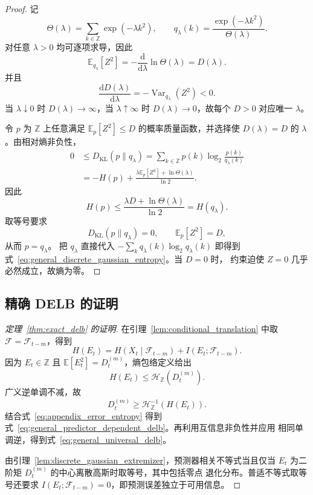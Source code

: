 \begin{proof}
记
\[
\Theta(\lambda)
=
\sum_{k\in\mathbb{Z}}\exp(-\lambda k^2),
\qquad
q_\lambda(k)
=
\frac{\exp(-\lambda k^2)}{\Theta(\lambda)}.
\]
对任意 \(\lambda>0\) 均可逐项求导，因此
\[
\mathbb{E}_{q_\lambda}[Z^2]
=
-\frac{\mathrm{d}}{\mathrm{d}\lambda}\ln\Theta(\lambda)
=D(\lambda).
\]
并且
\[
\frac{\mathrm{d}D(\lambda)}{\mathrm{d}\lambda}
=
-\operatorname{Var}_{q_\lambda}(Z^2)<0.
\]
当 \(\lambda\downarrow0\) 时 \(D(\lambda)\to\infty\)，当
\(\lambda\uparrow\infty\) 时 \(D(\lambda)\to0\)，故每个 \(D>0\)
对应唯一 \(\lambda\)。

令 \(p\) 为 \(\mathbb Z\) 上任意满足
\(\mathbb{E}_{p}[Z^2]\leq D\) 的概率质量函数，并选择使
\(D(\lambda)=D\) 的 \(\lambda\)。由相对熵非负性，
\begin{align}
0
&\leq
D_{\mathrm{KL}}(p\|q_\lambda)
=
\sum_{k\in\mathbb{Z}}p(k)
\log_2\frac{p(k)}{q_\lambda(k)}
\nonumber\\
&=
-H(p)
+
\frac{\lambda\mathbb{E}_{p}[Z^2]+\ln\Theta(\lambda)}{\ln2}.
\label{eq:kl_discrete_gaussian}
\end{align}
因此
\begin{equation}
H(p)
\leq
\frac{\lambda D+\ln\Theta(\lambda)}{\ln2}
=
H(q_\lambda).
\label{eq:integer_max_entropy}
\end{equation}
取等号要求
\[
D_{\mathrm{KL}}(p\|q_\lambda)=0,
\qquad
\mathbb{E}_{p}[Z^2]=D,
\]
从而 \(p=q_\lambda\)。
把 \(q_\lambda\) 直接代入
\(-\sum_kq_\lambda(k)\log_2q_\lambda(k)\) 即得到
式~\eqref{eq:general_discrete_gaussian_entropy}。当 \(D=0\) 时，
约束迫使 \(Z=0\) 几乎必然成立，故熵为零。
\end{proof}

\subsection{精确 DELB 的证明}

\begin{proof}[定理~\ref{thm:exact_delb} 的证明]
在引理~\ref{lem:conditional_translation} 中取
\(\mathcal F=\mathcal F_{t-m}\)，得到
\begin{equation}
H(E_t)
=
H(X_t\mid\mathcal{F}_{t-m})
+
I(E_t;\mathcal{F}_{t-m}).
\label{eq:appendix_error_entropy}
\end{equation}
因为 \(E_t\in\mathbb Z\) 且
\(\mathbb E[E_t^2]=D_t^{(m)}\)，熵包络定义给出
\[
H(E_t)\leq\mathcal{H}_{\mathbb{Z}}(D_t^{(m)}).
\]
广义逆单调不减，故
\[
D_t^{(m)}
\geq
\mathcal{H}_{\mathbb{Z}}^{-1}\!\left(H(E_t)\right).
\]
结合式~\eqref{eq:appendix_error_entropy} 得到
式~\eqref{eq:general_predictor_dependent_delb}。再利用互信息非负性并应用
相同单调逆，得到式~\eqref{eq:general_universal_delb}。

由引理~\ref{lem:discrete_gaussian_extremizer}，预测器相关不等式当且仅当
\(E_t\) 为二阶矩 \(D_t^{(m)}\) 的中心离散高斯时取等号，其中包括零点
退化分布。普适不等式取等号还要求
\(I(E_t;\mathcal F_{t-m})=0\)，即预测误差独立于可用信息。
\end{proof}


